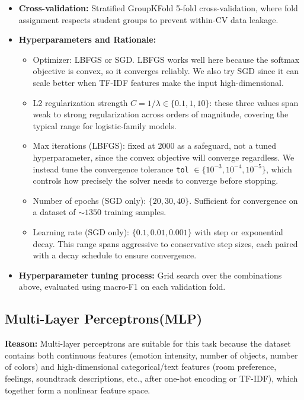 \documentclass[12pt]{article}
\begin{document}
        \begin{itemize}
        \item \textbf{Cross-validation:} Stratified GroupKFold 5-fold cross-validation, where fold assignment respects student groups to prevent within-CV data leakage.
        \item \textbf{Hyperparameters and Rationale:}
            \begin{itemize}
                \item Optimizer: LBFGS or SGD. LBFGS works well here because the softmax objective is convex, so it converges reliably. We also try SGD since it can scale better when TF-IDF features make the input high-dimensional.
                \item L2 regularization strength $C = 1/\lambda \in \{0.1, 1, 10\}$: these three values span weak to strong regularization across orders of magnitude, covering the typical range for logistic-family models.
                \item Max iterations (LBFGS): fixed at 2000 as a safeguard, not a tuned hyperparameter, since the convex objective will converge regardless. We instead tune the convergence tolerance \texttt{tol} $\in \{10^{-3}, 10^{-4}, 10^{-5}\}$, which controls how precisely the solver needs to converge before stopping.
                \item Number of epochs (SGD only): $\{20, 30, 40\}$. Sufficient for convergence on a dataset of ${\sim}1350$ training samples.
                \item Learning rate (SGD only): $\{0.1, 0.01, 0.001\}$ with step or exponential decay. This range spans aggressive to conservative step sizes, each paired with a decay schedule to ensure convergence.
            \end{itemize}
    \item \textbf{Hyperparameter tuning process:} Grid search over the combinations above, evaluated using macro-F1 on each validation fold.
        
    \end{itemize}

\subsection{Multi-Layer Perceptrons(MLP)}

\textbf{Reason:}
Multi-layer perceptrons are suitable for this task because the dataset contains both
continuous features (emotion intensity, number of objects, number of colors) and high-dimensional categorical/text features (room preference, feelings, soundtrack descriptions, etc., after one-hot encoding or TF-IDF),
which together form a nonlinear feature space.
\end{document}
